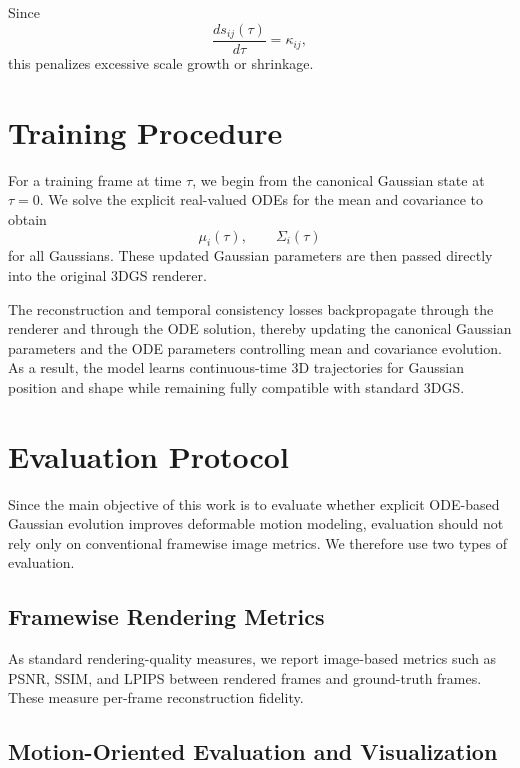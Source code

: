 \documentclass[11pt]{article}
\begin{document}
Since
\begin{equation}
\frac{d s_{ij}(\tau)}{d\tau}
=
\kappa_{ij},
\end{equation}
this penalizes excessive scale growth or shrinkage.

\section{Training Procedure}

For a training frame at time $\tau$, we begin from the canonical Gaussian state at $\tau=0$. We solve the explicit real-valued ODEs for the mean and covariance to obtain
\begin{equation}
\mu_i(\tau),
\qquad
\Sigma_i(\tau)
\end{equation}
for all Gaussians. These updated Gaussian parameters are then passed directly into the original 3DGS renderer.

The reconstruction and temporal consistency losses backpropagate through the renderer and through the ODE solution, thereby updating the canonical Gaussian parameters and the ODE parameters controlling mean and covariance evolution. As a result, the model learns continuous-time 3D trajectories for Gaussian position and shape while remaining fully compatible with standard 3DGS.

\section{Evaluation Protocol}

Since the main objective of this work is to evaluate whether explicit ODE-based Gaussian evolution improves deformable motion modeling, evaluation should not rely only on conventional framewise image metrics. We therefore use two types of evaluation.

\subsection{Framewise Rendering Metrics}

As standard rendering-quality measures, we report image-based metrics such as PSNR, SSIM, and LPIPS between rendered frames and ground-truth frames. These measure per-frame reconstruction fidelity.

\subsection{Motion-Oriented Evaluation and Visualization}
\end{document}
